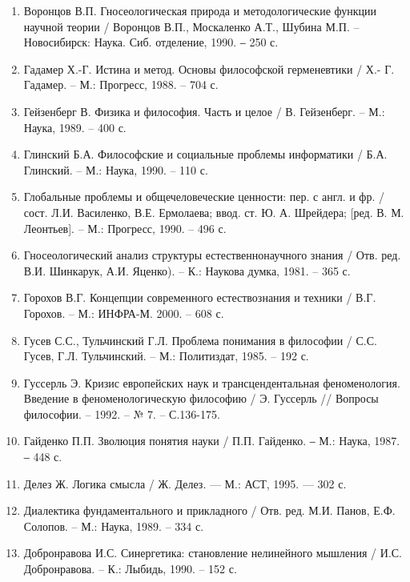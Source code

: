 \begin{enumerate}
\item Воронцов В.П. Гносеологическая природа и методологические функции
научной теории / Воронцов В.П., Москаленко А.Т., Шубина М.П. –
Новосибирск: Наука. Сиб. отделение, 1990. ‒ 250 с.

\item Гадамер Х.-Г. Истина и метод. Основы философской герменевтики / Х.-
Г. Гадамер. – М.: Прогресс, 1988. – 704 с.

\item Гейзенберг В. Физика и философия. Часть и целое / В. Гейзенберг. – М.:
Наука, 1989. – 400 с.

\item Глинский Б.А. Философские и социальные проблемы информатики /
Б.А. Глинский. – М.: Наука, 1990. – 110 с.

\item Глобальные проблемы и общечеловеческие ценности: пер. с англ. и фр. /
сост. Л.И. Василенко, В.Е. Ермолаева; ввод. ст. Ю. А. Шрейдера; [ред. В. М.
Леонтьев]. – М.: Прогресс, 1990. – 496 с.

\item Гносеологический анализ структуры естественнонаучного знания / Отв.
ред. В.И. Шинкарук, А.И. Яценко). – К.: Наукова думка, 1981. – 365 с.

\item Горохов В.Г. Концепции современного естествознания и техники / В.Г.
Горохов. – М.: ИНФРА-М. 2000. – 608 с.

\item Гусев С.С., Тульчинский Г.Л. Проблема понимания в философии / С.С.
Гусев, Г.Л. Тульчинский. – М.: Политиздат, 1985. – 192 с.

\item Гуссерль Э. Кризис европейских наук и трансцендентальная
феноменология. Введение в феноменологическую философию / Э. Гуссерль //
Вопросы философии. – 1992. – № 7. – С.136-175.

\item Гайденко П.П. Зволюция понятия науки / П.П. Гайденко. ‒ М.: Наука,
1987. ‒ 448 с.

\item Делез Ж. Логика смысла / Ж. Делез. --- М.: АСТ, 1995. --- 302 с.

\item Диалектика фундаментального и прикладного / Отв. ред. М.И. Панов,
Е.Ф. Солопов. – М.: Наука, 1989. – 334 с.

\item Добронравова И.С. Синергетика: становление нелинейного мышления /
И.С. Добронравова. – К.: Лыбидь, 1990. – 152 с.


\end{enumerate}
